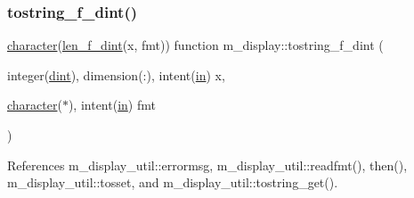 \subsubsection{\texorpdfstring{tostring\+\_\+f\+\_\+dint()}{tostring\_f\_dint()}}
{\footnotesize\ttfamily \hyperlink{option__stopwatch_83_8txt_abd4b21fbbd175834027b5224bfe97e66}{character}(\hyperlink{namespacem__display_a6a2709cf5f243ee492f223b40c6b5143}{len\+\_\+f\+\_\+dint}(x, fmt)) function m\+\_\+display\+::tostring\+\_\+f\+\_\+dint (\begin{DoxyParamCaption}\item[{integer(\hyperlink{namespacem__display_a73f772e9702cad6f40b78364fde2c7cd}{dint}), dimension(\+:), intent(\hyperlink{M__journal_83_8txt_afce72651d1eed785a2132bee863b2f38}{in})}]{x,  }\item[{\hyperlink{option__stopwatch_83_8txt_abd4b21fbbd175834027b5224bfe97e66}{character}($\ast$), intent(\hyperlink{M__journal_83_8txt_afce72651d1eed785a2132bee863b2f38}{in})}]{fmt }\end{DoxyParamCaption})\hspace{0.3cm}{\ttfamily [private]}}



References m\+\_\+display\+\_\+util\+::errormsg, m\+\_\+display\+\_\+util\+::readfmt(), then(), m\+\_\+display\+\_\+util\+::tosset, and m\+\_\+display\+\_\+util\+::tostring\+\_\+get().

